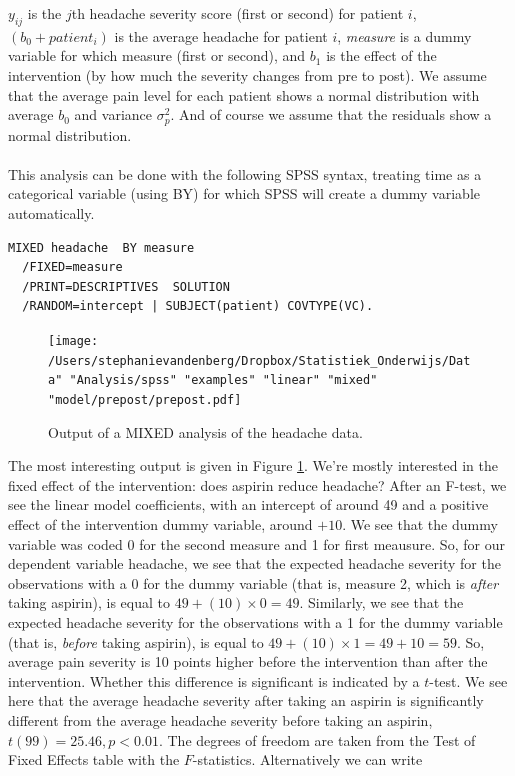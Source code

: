 \documentclass[]{report}\usepackage[]{graphicx}\usepackage[]{color}
\begin{document}
$y_{ij}$ is the $j$th headache severity score (first or second) for patient $i$, $(b_0 + patient_i)$ is the average headache for patient $i$, \textit{measure} is a dummy variable for which measure (first or second), and $b_1$ is the effect of the intervention (by how much the severity changes from pre to post). We assume that the average pain level for each patient shows a normal distribution with average $b_0$ and variance $\sigma^2_p$. And of course we assume that the residuals show a normal distribution.
\\
\\
This analysis can be done with the following SPSS syntax, treating time as a categorical variable (using BY) for which SPSS will create a dummy variable automatically. 


\begin{verbatim}
MIXED headache  BY measure
  /FIXED=measure
  /PRINT=DESCRIPTIVES  SOLUTION
  /RANDOM=intercept | SUBJECT(patient) COVTYPE(VC).
\end{verbatim}


\begin{figure}[h]
    \begin{center}
       \texttt{[image: /Users/stephanievandenberg/Dropbox/Statistiek\_Onderwijs/Data" "Analysis/spss" "examples" "linear" "mixed" "model/prepost/prepost.pdf]}
    \end{center}
    \label{fig:prepost}
    \caption{Output of a MIXED analysis of the headache data.}
\end{figure}

The most interesting output is given in Figure \ref{fig:prepost}. We're mostly interested in the fixed effect of the intervention: does aspirin reduce headache? After an F-test, we see the linear model coefficients, with an intercept of around 49 and a positive effect of the intervention dummy variable, around $+10$. We see that the dummy variable was coded 0 for the second measure and 1 for first meausure. So, for our dependent variable headache, we see that the expected headache severity for the observations with a 0 for the dummy variable (that is, measure 2, which is \textit{after} taking aspirin), is equal to $49 + (10) \times 0 = 49$. Similarly, we see that the expected headache severity for the observations with a 1 for the dummy variable (that is, \textit{before} taking aspirin), is equal to $49 + (10) \times 1 = 49 + 10 = 59$. So, average pain severity is 10 points higher before the intervention than after the intervention. Whether this difference is significant is indicated by a $t$-test. We see here that the average headache severity after taking an aspirin is significantly different from the average headache severity before taking an aspirin, $t(99) = 25.46, p < 0.01$. The degrees of freedom are taken from the Test of Fixed Effects table with the $F$-statistics. Alternatively we can write 
\end{document}
